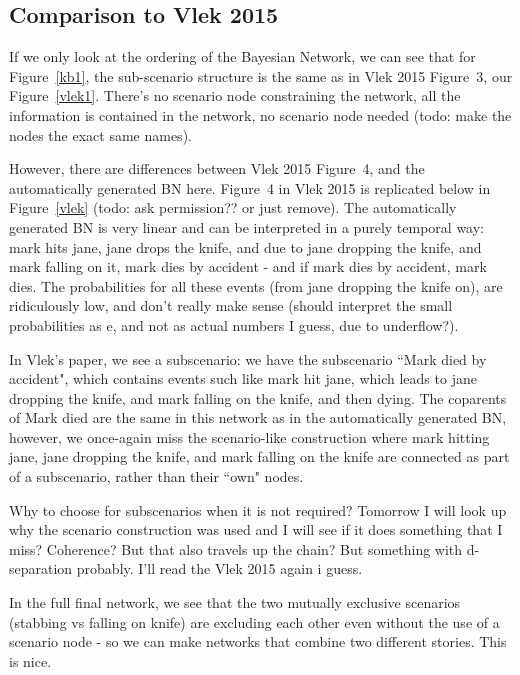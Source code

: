 \subsection{Comparison to Vlek 2015}
If we only look at the ordering of the Bayesian Network, we can see that for Figure~\ref{kb1}, the sub-scenario structure is the same as in Vlek 2015 Figure~3, our Figure~\ref{vlek1}. There's no scenario node constraining the network, all the information is contained in the network, no scenario node needed (todo: make the nodes the exact same names).

However, there are differences between Vlek 2015 Figure~4, and the automatically generated BN here. Figure~4 in Vlek 2015 is replicated below in Figure~\ref{vlek} (todo: ask permission?? or just remove). The automatically generated BN is very linear and can be interpreted in a purely temporal way: mark hits jane, jane drops the knife, and due to jane dropping the knife, and mark falling on it, mark dies by accident - and if mark dies by accident, mark dies. The probabilities for all these events (from jane dropping the knife on), are ridiculously low, and don't really make sense (should interpret the small probabilities as e, and not as actual numbers I guess, due to underflow?). 

In Vlek's paper, we see a subscenario: we have the subscenario ``Mark died by accident", which contains events such like mark hit jane, which leads to jane dropping the knife, and mark falling on the knife, and then dying. The coparents of Mark died are the same in this network as in the automatically generated BN, however, we once-again miss the scenario-like construction where mark hitting jane, jane dropping the knife, and mark falling on the knife are connected as part of a subscenario, rather than their ``own" nodes.


Why to choose for subscenarios when it is not required? Tomorrow I will look up why the scenario construction was used and I will see if it does something that I miss? Coherence? But that also travels up the chain? But something with d-separation probably. I'll read the Vlek 2015 again i guess.



In the full final network, we see that the two mutually exclusive scenarios (stabbing vs falling on knife) are excluding each other even without the use of a scenario node - so we can make networks that combine two different stories. This is nice.

